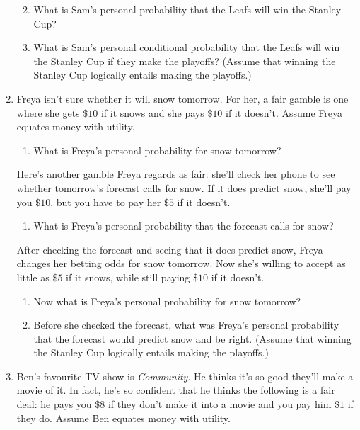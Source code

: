 \documentclass[justified]{tufte-book}
\providecommand{\tightlist}{%
  \setlength{\itemsep}{0pt}\setlength{\parskip}{0pt}}
\theoremstyle{definition}
\theoremstyle{definition}
\theoremstyle{definition}
\theoremstyle{remark}
\begin{document}
\begin{enumerate}
  \begin{enumerate}
  \def\labelenumii{\alph{enumii}.}
  \setcounter{enumii}{1}
  \tightlist
  \item
    What is Sam's personal probability that the Leafs will win the
    Stanley Cup?
  \item
    What is Sam's personal conditional probability that the Leafs will
    win the Stanley Cup if they make the playoffs? (Assume that winning
    the Stanley Cup logically entails making the playoffs.)
  \end{enumerate}
\item
  Freya isn't sure whether it will snow tomorrow. For her, a fair gamble
  is one where she gets \(\$10\) if it snows and she pays \(\$10\) if it
  doesn't. Assume Freya equates money with utility.

  \begin{enumerate}
  \def\labelenumii{\alph{enumii}.}
  \tightlist
  \item
    What is Freya's personal probability for snow tomorrow?
  \end{enumerate}

  Here's another gamble Freya regards as fair: she'll check her phone to
  see whether tomorrow's forecast calls for snow. If it does predict
  snow, she'll pay you \(\$10\), but you have to pay her \(\$5\) if it
  doesn't.

  \begin{enumerate}
  \def\labelenumii{\alph{enumii}.}
  \setcounter{enumii}{1}
  \tightlist
  \item
    What is Freya's personal probability that the forecast calls for
    snow?
  \end{enumerate}

  After checking the forecast and seeing that it does predict snow,
  Freya changes her betting odds for snow tomorrow. Now she's willing to
  accept as little as \(\$5\) if it snows, while still paying \(\$10\)
  if it doesn't.

  \begin{enumerate}
  \def\labelenumii{\alph{enumii}.}
  \setcounter{enumii}{2}
  \tightlist
  \item
    Now what is Freya's personal probability for snow tomorrow?
  \item
    Before she checked the forecast, what was Freya's personal
    probability that the forecast would predict snow and be right.
    (Assume that winning the Stanley Cup logically entails making the
    playoffs.)
  \end{enumerate}
\item
  Ben's favourite TV show is \emph{Community}. He thinks it's so good
  they'll make a movie of it. In fact, he's so confident that he thinks
  the following is a fair deal: he pays you \(\$8\) if they don't make
  it into a movie and you pay him \(\$1\) if they do. Assume Ben equates
  money with utility.


\end{enumerate}
\end{document}
